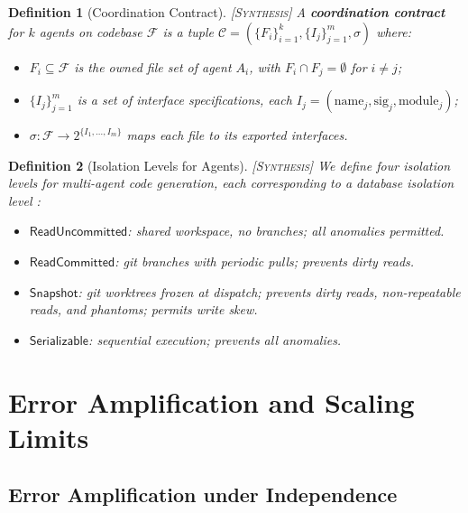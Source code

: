\documentclass[11pt, a4paper, logo, copyright]{googledeepmind}
\newtheorem{definition}{Definition}[section]
\newcommand{\synthesis}{\textsc{[Synthesis]}}
\begin{document}
\begin{definition}[Coordination Contract] \synthesis{}
\label{def:contract}
A \textbf{coordination contract} for $k$ agents on codebase $\mathcal{F}$ is a tuple $\mathcal{C} = (\{F_i\}_{i=1}^k, \{I_j\}_{j=1}^m, \sigma)$ where:
\begin{itemize}[nosep]
  \item $F_i \subseteq \mathcal{F}$ is the owned file set of agent $A_i$, with $F_i \cap F_j = \emptyset$ for $i \neq j$;
  \item $\{I_j\}_{j=1}^m$ is a set of interface specifications, each $I_j = (\mathrm{name}_j, \mathrm{sig}_j, \mathrm{module}_j)$;
  \item $\sigma: \mathcal{F} \to 2^{\{I_1,\ldots,I_m\}}$ maps each file to its exported interfaces.
\end{itemize}
\end{definition}

\begin{definition}[Isolation Levels for Agents] \synthesis{}
\label{def:isolation}
We define four isolation levels for multi-agent code generation, each corresponding to a database isolation level \citep{Berenson1995}:
\begin{itemize}[nosep]
  \item $\mathsf{ReadUncommitted}$: shared workspace, no branches; all anomalies permitted.
  \item $\mathsf{ReadCommitted}$: git branches with periodic pulls; prevents dirty reads.
  \item $\mathsf{Snapshot}$: git worktrees frozen at dispatch; prevents dirty reads, non-repeatable reads, and phantoms; permits write skew.
  \item $\mathsf{Serializable}$: sequential execution; prevents all anomalies.
\end{itemize}
\end{definition}


\section{Error Amplification and Scaling Limits}
\label{sec:error}

\subsection{Error Amplification under Independence}
\end{document}
